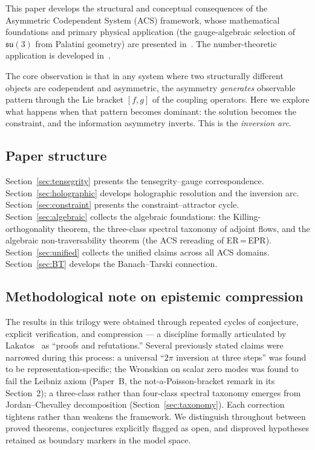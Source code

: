 \documentclass[11pt,a4paper]{article}
\theoremstyle{plain}
\theoremstyle{definition}
\theoremstyle{remark}
\begin{document}
\medskip\noindent
This paper develops the structural and conceptual consequences of the
Asymmetric Codependent System (ACS) framework, whose mathematical
foundations and primary physical application (the gauge-algebraic
selection of $\mathfrak{su}(3)$ from Palatini geometry) are presented
in~\cite{Wallace2026a}.  The number-theoretic application is developed
in~\cite{Wallace2026b}.

The core observation is that in any system where two structurally
different objects are codependent and asymmetric, the asymmetry
\emph{generates} observable pattern through the Lie bracket $[f,g]$
of the coupling operators.  Here we explore what happens when that
pattern becomes dominant: the solution becomes the constraint, and the
information asymmetry inverts.  This is the \emph{inversion arc}.

\subsection{Paper structure}
Section~\ref{sec:tensegrity} presents the tensegrity--gauge correspondence.
Section~\ref{sec:holographic} develops holographic resolution and the inversion arc.
Section~\ref{sec:constraint} presents the constraint--attractor cycle.
Section~\ref{sec:algebraic} collects the algebraic foundations: the
Killing-orthogonality theorem, the three-class spectral taxonomy of
adjoint flows, and the algebraic non-traversability theorem (the
ACS rereading of ER\,=\,EPR).
Section~\ref{sec:unified} collects the unified claims across all ACS domains.
Section~\ref{sec:BT} develops the Banach--Tarski connection.

\subsection*{Methodological note on epistemic compression}

The results in this trilogy were obtained through repeated cycles of
conjecture, explicit verification, and compression --- a discipline
formally articulated by Lakatos~\cite{Lakatos1976} as ``proofs and
refutations.''  Several previously stated claims were narrowed during
this process: a universal ``$2\pi$ inversion at three steps'' was
found to be representation-specific; the Wronskian on scalar zero
modes was found to fail the Leibniz axiom (Paper~B, the
not-a-Poisson-bracket remark in its Section~2); a three-class rather than four-class spectral taxonomy
emerges from Jordan--Chevalley decomposition (Section~\ref{sec:taxonomy}).
Each correction tightens rather than weakens the framework.  We
distinguish throughout between proved theorems, conjectures explicitly
flagged as open, and disproved hypotheses retained as boundary
markers in the model space.
\end{document}
